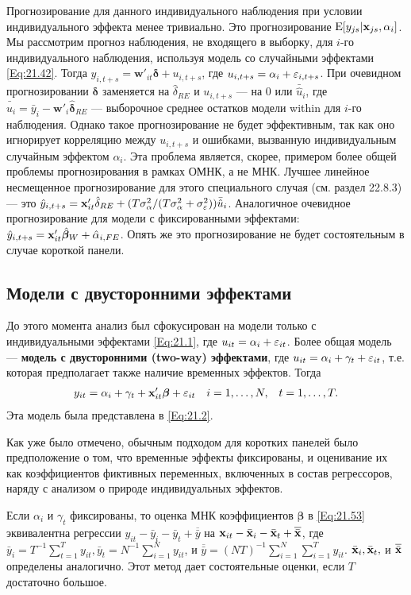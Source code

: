 Прогнозирование для данного индивидуального наблюдения при условии индивидуального эффекта менее тривиально. Это прогнозирование $\mathrm E[y_{js}|\mathbf{x}_{js}, \alpha_i]$. Мы рассмотрим прогноз наблюдения, не входящего в выборку, для $i$-го индивидуального наблюдения, используя модель со случайными эффектами \ref{Eq:21.42}. Тогда $y_{i,t+s}=\mathbf w'_{it} \bm\delta + u_{i,t+s}$, где $u_{i,t+s}=\alpha_i+\varepsilon_{i,t+s}$. При очевидном прогнозировании $\bm\delta$ заменяется на $\hat{\delta}_{RE}$ и $u_{i,t+s}$ --- на 0 или $\bar{\hat{u}}_i$, где $\bar{\hat{u}}_i=\bar{y}_i-\mathbf w'_i\hat{\bm\delta}_{RE}$ --- выборочное среднее остатков модели within для $i$-го наблюдения. Однако такое прогнозирование не будет эффективным, так как оно игнорирует корреляцию между $u_{i,t+s}$ и ошибками, вызванную индивидуальным случайным эффектом $\alpha_i$. Эта проблема является, скорее, примером более общей проблемы прогнозирования в рамках ОМНК, а не МНК. Лучшее линейное несмещенное прогнозирование для этого специального случая (см. раздел 22.8.3) --- это $\hat{y}_{i,t+s}=\mathbf{x}'_{it}\hat{\delta}_{RE}+(T\sigma^2_\alpha/(T\sigma^2_\alpha+\sigma^2_\varepsilon))\bar{\hat{u}}_i$.
Аналогичное очевидное прогнозирование для модели с фиксированными эффектами: $\hat{y}_{i,t+s}=\mathbf{x}'_{it}\hat{\bm\beta}_W+\hat{\alpha}_{i,FE}$. Опять же это прогнозирование не будет состоятельным в случае короткой панели.

\subsection{Модели с двусторонними  эффектами}

До этого момента анализ был сфокусирован на модели только с индивидуальными эффектами \ref{Eq:21.1}, где $u_{it}=\alpha_i+\varepsilon_{it}$. Более общая модель --- \textbf{модель с двусторонними (two-way) эффектами}, где $u_{it}=\alpha_i+\gamma_t+\varepsilon_{it}$, т.е. которая предполагает также наличие временных эффектов. Тогда
 \begin{align}
& y_{it}=\alpha_i+\gamma_t+\mathbf{x}'_{it}\bm\beta+\varepsilon_{it}
& i=1, \dots, N, &
& t=1, \dots, T.
\label{Eq:21.53}
\end{align}
Эта модель была представлена в \ref{Eq:21.2}.

Как уже было отмечено, обычным подходом для коротких панелей было предположение о том, что временные эффекты фиксированы, и оценивание их как коэффициентов фиктивных переменных, включенных в состав регрессоров, наряду с анализом о природе индивидуальных эффектов.

Если $\alpha_i$ и $\gamma_t$ фиксированы, то оценка МНК коэффициентов $\bm\beta$ в \ref{Eq:21.53} эквивалентна регрессии $y_{it}-\bar{y}_i-\bar{y}_t+\overline{\bar{y}}$ на $\mathbf{x}_{it}-\bar{\mathbf{x}}_i-\bar{\mathbf{x}}_t+\overline{\bar{\mathbf{x}}}$, где $\bar{y}_i=T^{-1}\sum^T_{t=1} y_{it}, \bar{y}_t=N^{-1}\sum^N_{i=1}y_{it}$, и $\overline{\bar{y}}=(NT)^{-1}\sum^N_{i=1} \sum^T_{i=1}y_{it}$. $\bar{\mathbf{x}}_i, \bar{\mathbf{x}}_t,$ и $\overline{\bar{\mathbf{x}}}$ определены аналогично. Этот метод дает состоятельные оценки, если $T$ достаточно большое.

